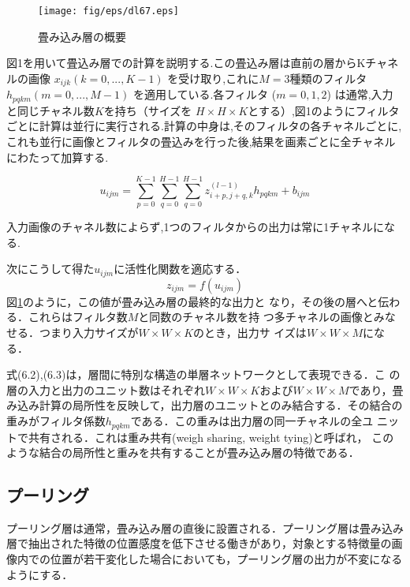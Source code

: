 \documentclass[a4paper,10pt]{jsarticle}
\begin{document}
\begin{figure}[t]
 \centering
 \texttt{[image: fig/eps/dl67.eps]}
  \caption{畳み込み層の概要}
  \label{fig:畳み込み層の概要}
\end{figure}

図1を用いて畳込み層での計算を説明する.この畳込み層は直前の層からKチャネルの画像 $x_{ijk} (k = 0,...,K − 1)$ を受け取り,これに$ M = 3 $種類のフィルタ $h_{pqkm} (m = 0,...,M − 1)$ を適用している.各フィルタ ($m = 0, 1, 2$) は通常,入力と同じチャネル数$K$を持ち（サイズを $H \times H \times K $とする）,図1のようにフィルタごとに計算は並行に実行される.計算の中身は,そのフィルタの各チャネルごとに,これも並行に画像とフィルタの畳込みを行った後,結果を画素ごとに全チャネルにわたって加算する.

\begin{equation}
  u_{ijm} = \sum_{p=0}^{K-1} \sum_{q=0}^{H-1} \sum_{q=0}^{H-1} z_{i+p,j+q,k}^{(l-1)} h_{pqkm}+b_{ijm}
\end{equation}

入力画像のチャネル数によらず,1つのフィルタからの出力は常に1チャネルになる.

次にこうして得た$u_{ijm}$に活性化関数を適応する．
\begin{equation}
 z_{ijm}=f(u_{ijm})
\end{equation}
図\ref{fig:畳み込み層の概要}のように，この値が畳み込み層の最終的な出力と
なり，その後の層へと伝わる．これらはフィルタ数$M$と同数のチャネル数を持
つ多チャネルの画像とみなせる．つまり入力サイズが$W\times W\times K$のとき，出力サ
イズは$W\times W\times M$になる．

式(6.2),(6.3)は，層間に特別な構造の単層ネットワークとして表現できる．こ
の層の入力と出力のユニット数はそれぞれ$W\times W\times K$および$W\times W\times M$であり，畳
み込み計算の局所性を反映して，出力層のユニットとのみ結合する．その結合の
重みがフィルタ係数$h_{pqkm}$である．この重みは出力層の同一チャネルの全ユ
ニットで共有される．これは重み共有(weigh sharing, weight tying)と呼ばれ，
このような結合の局所性と重みを共有することが畳み込み層の特徴である．

\subsection{プーリング}
プーリング層は通常，畳み込み層の直後に設置される．プーリング層は畳み込み層で抽出された特徴の位置感度を低下させる働きがあり，対象とする特徴量の画像内での位置が若干変化した場合においても，プーリング層の出力が不変になるようにする．
\end{document}
